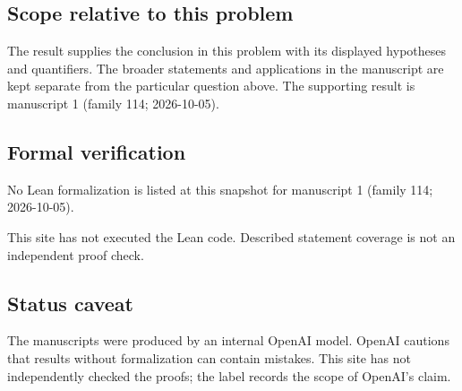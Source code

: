 \documentclass[11pt]{article}
\begin{document}
\subsection{Scope relative to this problem}
The result supplies the conclusion in this problem with its displayed hypotheses and quantifiers. The broader statements and applications in the manuscript are kept separate from the particular question above. The supporting result is manuscript 1 (family 114; 2026-10-05).

\subsection{Formal verification}
No Lean formalization is listed at this snapshot for manuscript 1 (family 114; 2026-10-05).

This site has not executed the Lean code. Described statement coverage is not an independent proof check.

\subsection{Status caveat}
The manuscripts were produced by an internal OpenAI model. OpenAI cautions that results without formalization can contain mistakes. This site has not independently checked the proofs; the label records the scope of OpenAI's claim.
\end{document}
